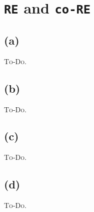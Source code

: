 

\setcounter{section}{3}


\section{\lstinline|RE| and \lstinline|co-RE|}

\subsection{(a)}
\textsc{To-Do.}

\subsection{(b)}
\textsc{To-Do.}

\subsection{(c)}
\textsc{To-Do.}

\subsection{(d)}
\textsc{To-Do.}


